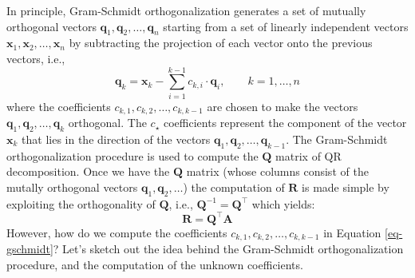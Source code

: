 \documentclass{article}[11pt]
\begin{document}
In principle, Gram-Schmidt orthogonalization generates a set of mutually orthogonal vectors $\mathbf{q}_{1},\mathbf{q}_{2},\hdots,
\mathbf{q}_{n}$ starting from a set of linearly independent vectors $\mathbf{x}_{1},\mathbf{x}_{2},\hdots,\mathbf{x}_{n}$ 
by subtracting the projection of each vector onto the previous vectors, i.e.,
\begin{equation}\label{eq-gschmidt}
\mathbf{q}_{k}=\mathbf{x}_{k}-\sum_{i=1}^{k-1}c_{k,i}\cdot\mathbf{q}_{i},
\qquad{k=1,\hdots,n}
\end{equation}where the coefficients $c_{k,1},c_{k,2},\hdots,c_{k,k-1}$ are chosen to make the vectors $\mathbf{q}_{1},\mathbf{q}_{2},\hdots,\mathbf{q}_{k}$ orthogonal.
The $c_{\star}$ coefficients represent the component of the vector $\mathbf{x}_{k}$ that lies in the direction of the vectors $\mathbf{q}_{1},\mathbf{q}_{2},\hdots,\mathbf{q}_{k-1}$.
The Gram-Schmidt orthogonalization procedure is used to compute the $\mathbf{Q}$ matrix of QR decomposition.
Once we have the $\mathbf{Q}$ matrix (whose columns consist of the mutally orthogonal vectors $\mathbf{q}_{1},\mathbf{q}_{2},\dots$) the computation
of $\mathbf{R}$ is made simple by exploiting the orthogonality of $\mathbf{Q}$, i.e., $\mathbf{Q}^{-1}=\mathbf{Q}^{\top}$ which yields:
\begin{equation}
\mathbf{R}=\mathbf{Q}^{\top}\mathbf{A}
\end{equation}
However, how do we compute the coefficients $c_{k,1},c_{k,2},\hdots,c_{k,k-1}$ in Equation \ref{eq-gschmidt}?
Let's sketch out the idea behind the Gram-Schmidt orthogonalization procedure, and the computation of the unknown coefficients.
\end{document}
